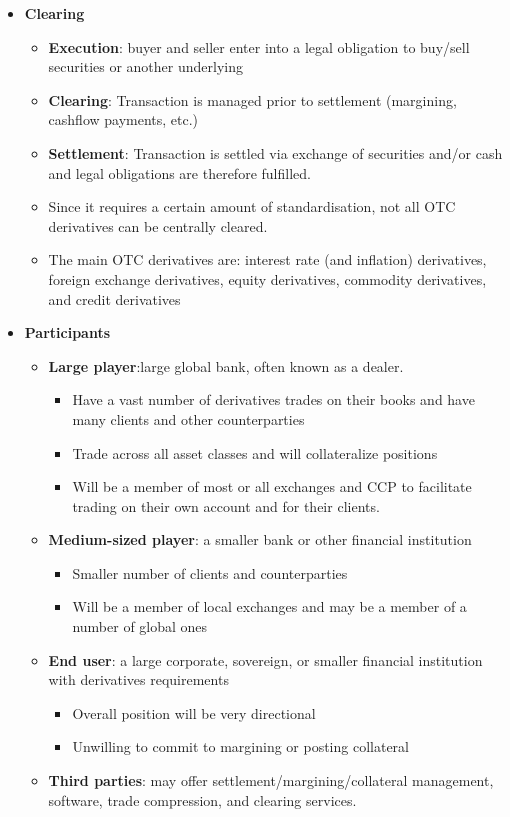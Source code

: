 \begin{itemize}
\item \textbf{Clearing}
\begin{itemize}
    \item \textbf{Execution}: buyer and seller enter into a legal obligation to buy/sell securities or another underlying
    \item \textbf{Clearing}: Transaction is managed prior to settlement (margining, cashflow payments, etc.)
    \item \textbf{Settlement}: Transaction is settled via exchange of securities and/or cash and legal obligations are therefore fulfilled.
    \item Since it requires a certain amount of standardisation, not all OTC derivatives can be centrally cleared.
    \item The main OTC derivatives are: interest rate (and inflation) derivatives, foreign exchange derivatives, equity derivatives, commodity derivatives, and credit derivatives
\end{itemize}





\item \textbf{Participants}

\begin{itemize}
    \item \textbf{Large player}:large global bank, often known as a dealer.
    \begin{itemize}
        \item Have a vast number of derivatives trades on their books and have many clients and other counterparties
        \item Trade across all asset classes and will collateralize positions
        \item Will be a member of most or all exchanges and CCP to facilitate trading on their own account and for their clients.
    \end{itemize}
    \item \textbf{Medium-sized player}: a smaller bank or other financial institution
    \begin{itemize}
        \item Smaller number of clients and counterparties
        \item Will be a member of local exchanges and may be a member of a number of global ones
    \end{itemize}
    \item \textbf{End user}: a large corporate, sovereign, or smaller financial institution with derivatives requirements
    \begin{itemize}
        \item Overall position will be very directional
        \item Unwilling to commit to margining or posting collateral
    \end{itemize}
    \item \textbf{Third parties}: may offer settlement/margining/collateral management, software, trade compression, and clearing services.


\end{itemize}
\end{itemize}
